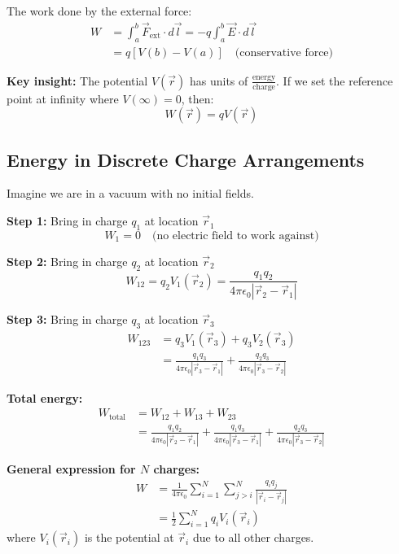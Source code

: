 \documentclass{article}
\begin{document}
The work done by the external force:
\begin{align}
    W &= \int_a^b \vec{F}_{\text{ext}} \cdot d\vec{l} = -q\int_a^b \vec{E} \cdot d\vec{l} \\
    &= q[V(b) - V(a)] \quad \text{(conservative force)}
\end{align}

\textbf{Key insight:} The potential $V(\vec{r})$ has units of $\frac{\text{energy}}{\text{charge}}$. If we set the reference point at infinity where $V(\infty) = 0$, then:
\begin{equation}
    W(\vec{r}) = qV(\vec{r})
\end{equation}

\subsection{Energy in Discrete Charge Arrangements}
Imagine we are in a vacuum with no initial fields.

\textbf{Step 1:} Bring in charge $q_1$ at location $\vec{r}_1$
\begin{equation}
    W_1 = 0 \quad \text{(no electric field to work against)}
\end{equation}

\textbf{Step 2:} Bring in charge $q_2$ at location $\vec{r}_2$
\begin{equation}
    W_{12} = q_2 V_1(\vec{r}_2) = \frac{q_1 q_2}{4\pi\epsilon_0 |\vec{r}_2 - \vec{r}_1|}
\end{equation}

\textbf{Step 3:} Bring in charge $q_3$ at location $\vec{r}_3$
\begin{align}
    W_{123} &= q_3 V_1(\vec{r}_3) + q_3 V_2(\vec{r}_3) \\
    &= \frac{q_1 q_3}{4\pi\epsilon_0 |\vec{r}_3 - \vec{r}_1|} + \frac{q_2 q_3}{4\pi\epsilon_0 |\vec{r}_3 - \vec{r}_2|}
\end{align}

\textbf{Total energy:}
\begin{align}
    W_{\text{total}} &= W_{12} + W_{13} + W_{23} \\
    &= \frac{q_1 q_2}{4\pi\epsilon_0 |\vec{r}_2 - \vec{r}_1|} + \frac{q_1 q_3}{4\pi\epsilon_0 |\vec{r}_3 - \vec{r}_1|} + \frac{q_2 q_3}{4\pi\epsilon_0 |\vec{r}_3 - \vec{r}_2|}
\end{align}

\textbf{General expression for $N$ charges:}
\begin{align}
    W &= \frac{1}{4\pi\epsilon_0} \sum_{i=1}^N \sum_{j>i}^N \frac{q_i q_j}{|\vec{r}_i - \vec{r}_j|} \\
    &= \frac{1}{2} \sum_{i=1}^N q_i V_i(\vec{r}_i)
\end{align}
where $V_i(\vec{r}_i)$ is the potential at $\vec{r}_i$ due to all other charges.
\end{document}
